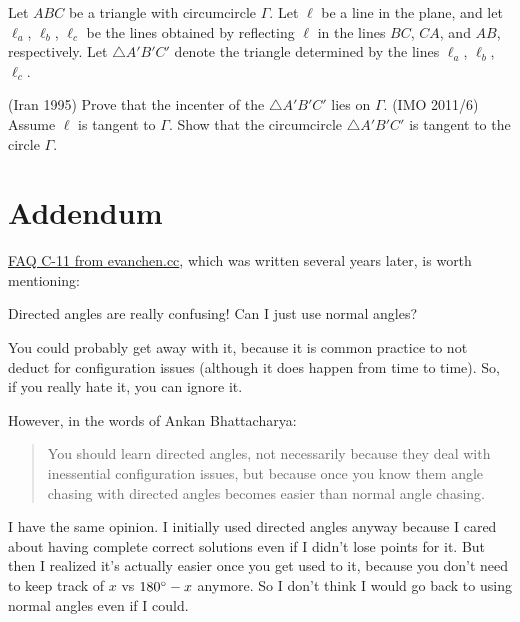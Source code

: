 \documentclass[11pt]{scrartcl}
\begin{document}
\begin{problem}
  Let $ABC$ be a triangle with circumcircle $\Gamma$.
  Let $\ell$ be a line in the plane, and let $\ell_a$, $\ell_b$, $\ell_c$ be the lines obtained
  by reflecting $\ell$ in the lines $BC$, $CA$, and $AB$, respectively.
  Let $\triangle A'B'C'$ denote the triangle determined by the lines $\ell_a$, $\ell_b$, $\ell_c$.
  \begin{enumerate}[(a)]
    \ii (Iran 1995) Prove that the incenter of the $\triangle A'B'C'$ lies on $\Gamma$.
    \ii (IMO 2011/6) Assume $\ell$ is tangent to $\Gamma$.
    Show that the circumcircle $\triangle A'B'C'$ is tangent to the circle $\Gamma$.
  \end{enumerate}
\end{problem}

\newpage
\appendix
\section{Addendum}
\href{https://web.evanchen.cc/faq-contest.html#C-11}{FAQ C-11 from evanchen.cc},
which was written several years later, is worth mentioning:

\begin{ques*}
Directed angles are really confusing! Can I just use normal angles?
\end{ques*}

\begin{answer*}
You could probably get away with it,
because it is common practice to not deduct for configuration issues
(although it does happen from time to time).
So, if you really hate it, you can ignore it.

However, in the words of Ankan Bhattacharya:
\begin{quote}
You should learn directed angles,
not necessarily because they deal with inessential configuration issues,
but because once you know them angle chasing with directed angles
becomes easier than normal angle chasing.
\end{quote}

I have the same opinion.
I initially used directed angles anyway because I cared about having
complete correct solutions even if I didn't lose points for it.
But then I realized it's actually easier once you get used to it,
because you don't need to keep track of $x$ vs $180^\circ-x$ anymore.
So I don't think I would go back to using normal angles even if I could.
\end{answer*}
\end{document}
